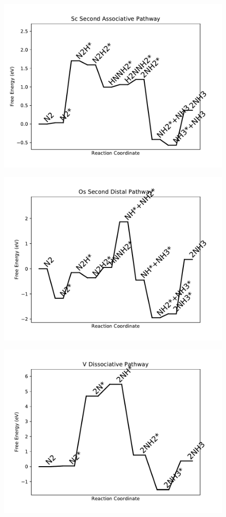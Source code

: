 \begin{figure}
\centering
\includegraphics[width=0.8\linewidth]{data/plots/Sc_associative_2.pdf}
\end{figure}

\begin{figure}
\centering
\includegraphics[width=0.8\linewidth]{data/plots/Os_distal_2.pdf}
\end{figure}

\begin{figure}
\centering
\includegraphics[width=0.8\linewidth]{data/plots/V_dissociative.pdf}
\end{figure}

